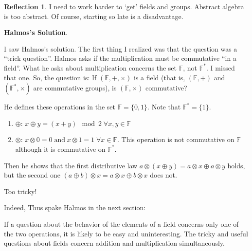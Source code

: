 \documentclass[english,notitlepage,smartquotes]{hgbreport}
\theoremstyle{definition}
\theoremstyle{definition}
\theoremstyle{remark}
\theoremstyle{definition}
\theoremstyle{plain}
\theoremstyle{definition}
\newtheorem{reflection}{Reflection}
\begin{document}
\begin{reflection}

I need to work harder to `get' fields and groups. Abstract algebra is too abstract. Of course, starting so late is a disadvantage.

\textbf{Halmos's Solution}.

I saw Halmos's solution. The first thing I realized was that the question was a ``trick question''. Halmos asks if the multiplication must be commutative ``in a field''. What he asks about multiplication concerns the set $\mathbb{F}$, not $\mathbb{F}^*$. I missed that one. So, the question is: If $(\mathbb{F},+,\times)$ is a field (that is, $(\mathbb{F},+)$ and $(\mathbb{F}^*,\times)$ are commutative groups), is $(\mathbb{F},\times)$ commutative?

He defines these operations in the set $\mathbb{F}=\{0,1\}$. Note that $\mathbb{F}^*=\{1\}$.
\begin{enumerate}
\item $\oplus$: $x\oplus y=(x+y) \mod 2\;\forall x,y\in\mathbb{F}$
\item $\otimes$: $x\otimes 0=0\;\text{and}\; x\otimes1=1\;\forall x\in\mathbb{F}$. This operation is not commutative on $\mathbb{F}$ although it is commutative on $\mathbb{F}^*$.
\end{enumerate}

Then he shows that the first distributive law $a\otimes(x\oplus y)  = a\otimes x\oplus a\otimes y$ holds, but the second one $(a\oplus b)\otimes x = a\otimes x\oplus b\otimes x$ does not.

Too tricky!

Indeed, Thus spake Halmos in the next section:
\begin{sidebar}
If a question about the behavior of the elements of a field concerns only one of the two operations, it is likely to be easy and uninteresting.  The tricky and useful questions about fields concern addition and multiplication simultaneously.
\end{sidebar}
\end{reflection}
\end{document}
